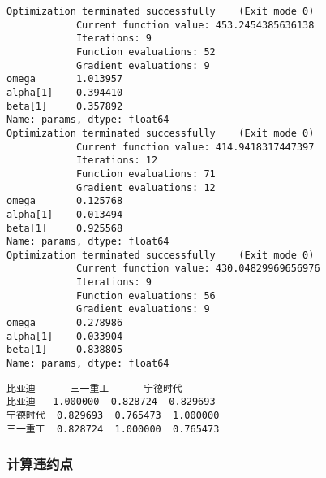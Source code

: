 \documentclass[11pt]{article}
\makeatletter
\newcommand{\boxspacing}{\kern\kvtcb@left@rule\kern\kvtcb@boxsep}
\newcommand{\prompt}[4]{
        {\ttfamily\llap{{\color{#2}[#3]:\hspace{3pt}#4}}\vspace{-\baselineskip}}
    }
\makeatother
\begin{document}
    \begin{Verbatim}[commandchars=\\\{\}]
Optimization terminated successfully    (Exit mode 0)
            Current function value: 453.2454385636138
            Iterations: 9
            Function evaluations: 52
            Gradient evaluations: 9
omega       1.013957
alpha[1]    0.394410
beta[1]     0.357892
Name: params, dtype: float64
Optimization terminated successfully    (Exit mode 0)
            Current function value: 414.9418317447397
            Iterations: 12
            Function evaluations: 71
            Gradient evaluations: 12
omega       0.125768
alpha[1]    0.013494
beta[1]     0.925568
Name: params, dtype: float64
Optimization terminated successfully    (Exit mode 0)
            Current function value: 430.04829969656976
            Iterations: 9
            Function evaluations: 56
            Gradient evaluations: 9
omega       0.278986
alpha[1]    0.033904
beta[1]     0.838805
Name: params, dtype: float64
    \end{Verbatim}

            \begin{tcolorbox}[breakable, size=fbox, boxrule=.5pt, pad at break*=1mm, opacityfill=0]
\prompt{Out}{outcolor}{3}{\boxspacing}
\begin{Verbatim}[commandchars=\\\{\}]
           比亚迪      三一重工      宁德时代
比亚迪   1.000000  0.828724  0.829693
宁德时代  0.829693  0.765473  1.000000
三一重工  0.828724  1.000000  0.765473
\end{Verbatim}
\end{tcolorbox}

    \hypertarget{ux8ba1ux7b97ux8fddux7ea6ux70b9}{%
\subsubsection{计算违约点}\label{ux8ba1ux7b97ux8fddux7ea6ux70b9}}
\end{document}
